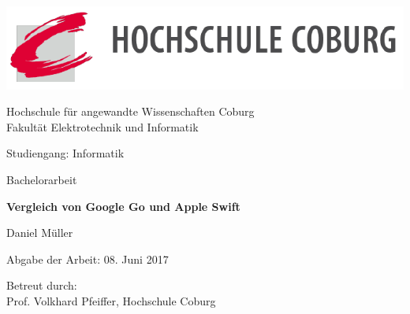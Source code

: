 \begin{titlepage}
    \begin{center}
    \includegraphics[width=\textwidth]{Images/logo}
        \begin{Large}
        Hochschule für angewandte Wissenschaften Coburg
        \\
        Fakultät Elektrotechnik und Informatik
        \par
        \end{Large}
        \vspace{2.0cm}
        
        \begin{Large}
            Studiengang: Informatik
            \par
        \end{Large}
        \vspace{1.5cm}
        
        {\Large
            Bachelorarbeit
        }
        \vspace{2.0cm}

        \begin{huge}
            \textbf{Vergleich von Google Go und Apple Swift} 
            \par
        \end{huge}        
        \vfill
        
        \begin{huge}
            Daniel Müller
        \end{huge}
        \vspace{2.0cm}
        
        \begin{large}
            Abgabe der Arbeit: 08. Juni 2017
            
            Betreut durch:
            \\
            Prof. Volkhard Pfeiffer, Hochschule Coburg
            \\
            \par
        \end{large}
        
    \end{center}
\end{titlepage}
\restoregeometry